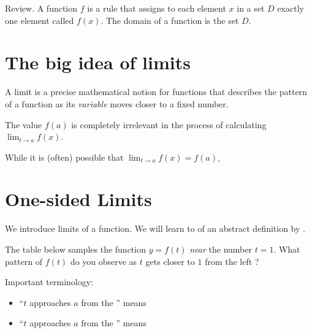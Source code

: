 \documentclass[../main.tex]{subfiles}
\begin{document}
\begin{mdframed}[style=withref]
  Review. A function \(f\) is a rule that assigns to {each} element \(x\) in a set \(D\) {exactly one} element called \(f(x)\). The {domain} of a function is the set \(D\).

\end{mdframed}

\section{The big idea of limits}

A limit is a precise mathematical notion for functions that describes the pattern of a function as its \emph{variable} moves closer to a fixed number. 

\begin{mdframed}[style=simple]
  The value $f(a)$ is completely irrelevant in the process of calculating $\lim_{t \to a} f(x)$. 
  
  While it is (often) possible that $\lim_{t \to a} f(x) = f(a)$, 
\end{mdframed}

\section{One-sided Limits}
We introduce limits of a function. We will learn to  of an abstract definition by .

\begin{example}
  The table below samples the function \(y = f(t)\) \emph{near} the number \(t = 1\).
  What pattern of \(f(t)\) do you observe as \(t\) gets closer to \(1\) from the left ?

\end{example}

Important terminology:
\begin{itemize}
  \item ``\(t\) approaches \(a\) from the '' means 
  \item ``\(t\) approaches \(a\) from the '' means 
\end{itemize}
\end{document}
